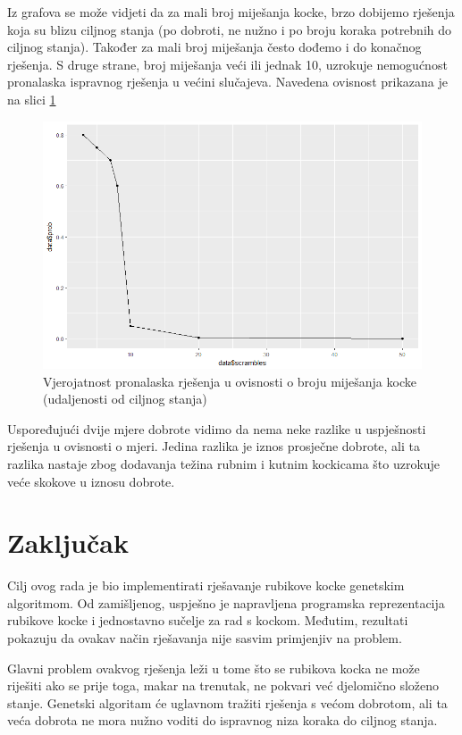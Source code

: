 \documentclass[times, utf8, seminar, numeric]{fer}
\begin{document}
\clearpage

Iz grafova se može vidjeti da za mali broj miješanja kocke, brzo dobijemo rješenja koja su blizu ciljnog stanja (po dobroti, ne nužno i po broju koraka potrebnih do ciljnog stanja). Također za mali broj miješanja često dođemo i do konačnog rješenja. 
S druge strane, broj miješanja veći ili jednak 10, uzrokuje nemogućnost pronalaska ispravnog rješenja u većini slučajeva. Navedena ovisnost prikazana je na slici \ref{ovisnost}

  		\begin{figure}[ht!]
			\centering
			\includegraphics[width=\textwidth]{../results/prob.png}
			\caption{Vjerojatnost pronalaska rješenja u ovisnosti o broju miješanja kocke (udaljenosti od ciljnog stanja)}
			\label{ovisnost}
		\end{figure}

Uspoređujući dvije mjere dobrote vidimo da nema neke razlike u uspješnosti rješenja u ovisnosti o mjeri. Jedina razlika je iznos prosječne dobrote, ali ta razlika nastaje zbog dodavanja težina rubnim i kutnim kockicama što uzrokuje veće skokove u iznosu dobrote.

\chapter{Zaključak}
Cilj ovog rada je bio implementirati rješavanje rubikove kocke genetskim algoritmom. Od zamišljenog, uspješno je napravljena programska reprezentacija rubikove kocke i jednostavno sučelje za rad s kockom. Međutim, rezultati pokazuju da ovakav način rješavanja nije sasvim primjenjiv na problem. 

Glavni problem ovakvog rješenja leži u tome što se rubikova kocka ne može riješiti ako se prije toga, makar na trenutak, ne pokvari već djelomično složeno stanje. Genetski algoritam će uglavnom tražiti rješenja s većom dobrotom, ali ta veća dobrota ne mora nužno voditi do ispravnog niza koraka do ciljnog stanja.
\end{document}
